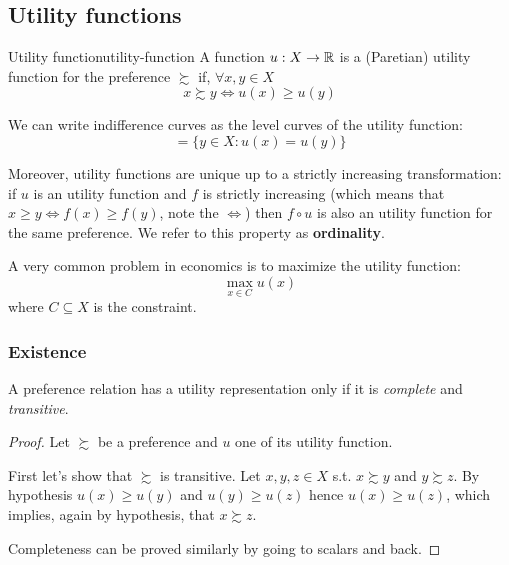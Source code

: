 \documentclass[12pt]{extarticle}
\begin{document}
\subsection{Utility functions}

\begin{definition}{Utility function}{utility-function}
    A function $u: X \to \mathbb{R}$ is a (Paretian) utility function for the preference $\succsim$ if, $\forall x, y \in X$
    \begin{equation}
        x \succsim y \iff u(x) \geq u(y)
    \end{equation}
\end{definition}

We can write indifference curves as the level curves of the utility function:
\begin{equation}
    [x] = \{ y \in X : u(x) = u(y) \}
\end{equation}

Moreover, utility functions are unique up to a strictly increasing transformation:
if $u$ is an utility function and $f$ is strictly increasing
(which means that $x \geq y \iff f(x) \geq f(y)$, note the $\iff$)
then $f \circ u$ is also an utility function for the same preference.
We refer to this property as \textbf{ordinality}.

A very common problem in economics is to maximize the utility function:
\begin{equation}
    \max_{x \in C} u(x)
\end{equation}
where $C \subseteq X$ is the constraint.

\subsubsection{Existence}

\begin{proposition}{}{}
    A preference relation has a utility representation only if it is
    \emph{complete} and \emph{transitive}.
\end{proposition}

\begin{proof}
    Let $\succsim$ be a preference and $u$ one of its utility function.

    First let's show that $\succsim$ is transitive.
    Let $x, y, z \in X$ s.t. $x \succsim y$ and $y \succsim z$.
    By hypothesis $u(x) \geq u(y)$ and $u(y) \geq u(z)$ hence $u(x) \geq u(z)$,
    which implies, again by hypothesis, that $x \succsim z$.

    Completeness can be proved similarly by going to scalars and back.
\end{proof}
\end{document}
